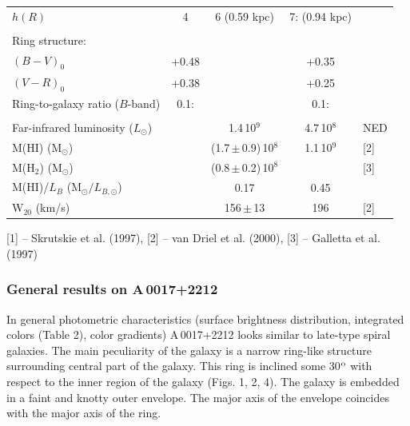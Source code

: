\documentclass[]{aa}
\begin{document}
\begin{table}
\begin{center}
\begin{tabular}{|l|ccc|l|}
\hspace*{3cm}$h(R)$                 & 4\farcs0 & 6\farcs4 (0.59 kpc) & 7\farcs3: (0.94 kpc) & \\
                                 &   &  &  &  \\
Ring structure:                &   &  &  &  \\
$(B-V)_0$                      & +0.48  &      & +0.35 &  \\
$(V-R)_0$                      & +0.38  &      & +0.25 &  \\
Ring-to-galaxy ratio ($B$-band)& 0.1:   &  & 0.1: &  \\
                                 &   &  &  &  \\
Far-infrared luminosity ($L_{\odot}$) & & 1.4\,10$^9$ & 4.7\,10$^8$  & NED  \\				 
M(HI) (M$_{\odot}$)          &   & (1.7\,$\pm$\,0.9)\,10$^8$ & 1.1\,10$^9$ & [2] \\
M(H$_2$) (M$_{\odot}$)       &   & (0.8\,$\pm$\,0.2)\,10$^8$ &  &  [3]\\
M(HI)/$L_B$ (M$_{\odot}/L_{B,\odot}$)       &   & 0.17 & 0.45 & \\
W$_{20}$ (km/s)                 &   & 156\,$\pm$\,13 & 196 & [2]\\
\hline
\end{tabular}
\end{center}
[1] -- Skrutskie et al. (1997), [2] -- van Driel et al. (2000),
[3] -- Galletta et al. (1997)
\end{table}

\subsubsection{General results on A\,0017+2212}

In general photometric characteristics (surface brightness
distribution, integrated colors (Table 2), color gradients) A\,0017+2212
looks similar to late-type spiral galaxies. The main peculiarity
of the galaxy is a narrow ring-like structure surrounding
central part of the galaxy. This ring is inclined some 30$^{\rm o}$
with respect to the inner region of the galaxy (Figs. 1, 2, 4).
The galaxy is embedded in a faint and knotty outer envelope.
The major axis of the envelope coincides with the major axis of
the ring. 
\end{document}
